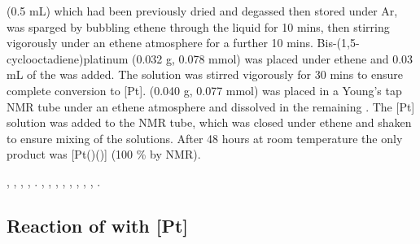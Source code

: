 
 (0.5 mL) which had been previously dried and degassed then stored under Ar, was sparged by bubbling ethene through the liquid for 10 mins, then stirring vigorously under an ethene atmosphere for a further 10 mins.  Bis-(1,5-cyclooctadiene)platinum (0.032 g, 0.078 mmol) was placed under ethene and 0.03 mL of the  was added.  The solution was stirred vigorously for 30 mins to ensure complete conversion to [Pt].  \tBuThixantphos(0.040 g, 0.077 mmol) was placed in a Young's tap NMR tube under an ethene atmosphere and dissolved in the remaining .  The [Pt] solution was added to the NMR tube, which was closed under ethene and shaken to ensure mixing of the solutions.  After 48 hours at room temperature the only product was [Pt(\tButhixantphos)()] (100 \% by NMR).  

,
,
,
,
.
,
,
,
,
,
,
,
,
.


\subsection*{Reaction of \tBuxantphos{} with \texorpdfstring{[Pt]} P}


